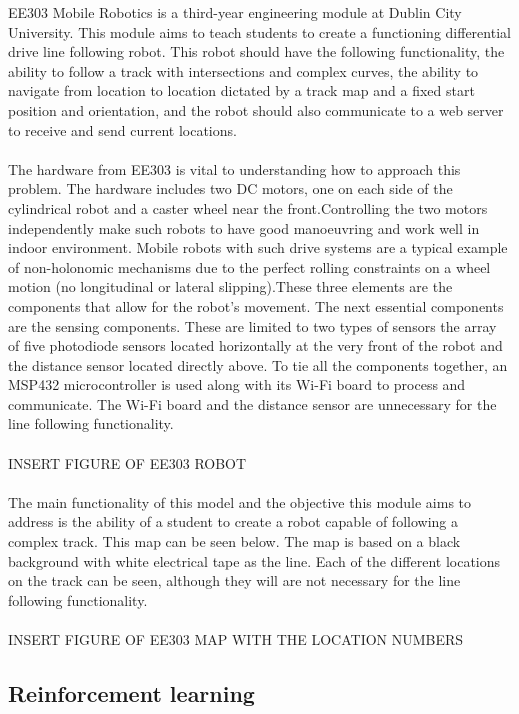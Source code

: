 \documentclass[12pt]{article}
\begin{document}
EE303 Mobile Robotics is a third-year engineering module at Dublin City University. This module aims to teach students to create a functioning differential drive line following robot. This robot should have the following functionality, the ability to follow a track with intersections and complex curves, the ability to navigate from location to location dictated by a track map and a fixed start position and orientation, and the robot should also communicate to a web server to receive and send current locations.
\\\\
The hardware from EE303 is vital to understanding how to approach this problem. The hardware includes two DC motors, one on each side of the cylindrical robot and a caster wheel near the front.Controlling the two motors independently make such robots to have good manoeuvring and work well in indoor environment. Mobile robots with such drive systems are a typical example of non-holonomic mechanisms due to the perfect rolling constraints on a wheel motion (no longitudinal or lateral slipping)\cite{}.These three elements are the components that allow for the robot's movement. The next essential components are the sensing components. These are limited to two types of sensors the array of five photodiode sensors located horizontally at the very front of the robot and the distance sensor located directly above. To tie all the components together, an MSP432 microcontroller is used along with its Wi-Fi board to process and communicate. The Wi-Fi board and the distance sensor are unnecessary for the line following functionality.
\\\\
INSERT FIGURE OF EE303 ROBOT
\\\\
The main functionality of this model and the objective this module aims to address is the ability of a student to create a robot capable of following a complex track. This map can be seen below. The map is based on a black background with white electrical tape as the line. Each of the different locations on the track can be seen, although they will are not necessary for the line following functionality.
\\\\
INSERT FIGURE OF EE303 MAP WITH THE LOCATION NUMBERS

\subsection{Reinforcement learning}
\end{document}
